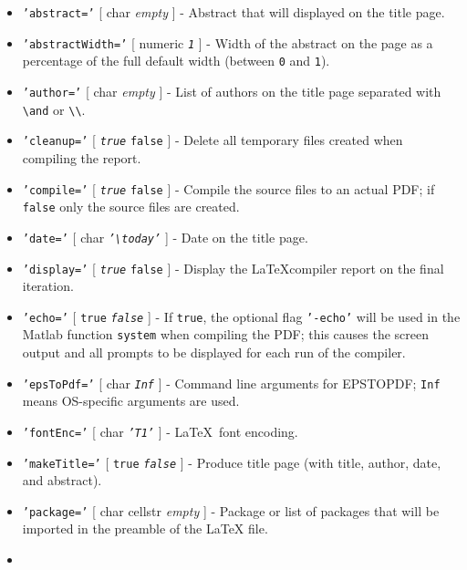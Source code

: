  \begin{itemize}
 \item
   \texttt{'abstract='} {[} char \textbar{} \emph{empty} {]} - Abstract
   that will displayed on the title page.
 \item
   \texttt{'abstractWidth='} {[} numeric \textbar{} \emph{\texttt{1}} {]}
   - Width of the abstract on the page as a percentage of the full
   default width (between \texttt{0} and \texttt{1}).
 \item
   \texttt{'author='} {[} char \textbar{} \emph{empty} {]} - List of
   authors on the title page separated with \texttt{\textbackslash{}and}
   or \texttt{\textbackslash{}\textbackslash{}}.
 \item
   \texttt{'cleanup='} {[} \emph{\texttt{true}} \textbar{} \texttt{false}
   {]} - Delete all temporary files created when compiling the report.
 \item
   \texttt{'compile='} {[} \emph{\texttt{true}} \textbar{} \texttt{false}
   {]} - Compile the source files to an actual PDF; if \texttt{false}
   only the source files are created.
 \item
   \texttt{'date='} {[} char \textbar{}
   \emph{\texttt{'\textbackslash{}today'}} {]} - Date on the title page.
 \item
   \texttt{'display='} {[} \emph{\texttt{true}} \textbar{} \texttt{false}
   {]} - Display the \LaTeX compiler report on the final iteration.
 \item
   \texttt{'echo='} {[} \texttt{true} \textbar{} \emph{\texttt{false}}
   {]} - If \texttt{true}, the optional flag \texttt{'-echo'} will be
   used in the Matlab function \texttt{system} when compiling the PDF;
   this causes the screen output and all prompts to be displayed for each
   run of the compiler.
 \item
   \texttt{'epsToPdf='} {[} char \textbar{} \emph{\texttt{Inf}} {]} -
   Command line arguments for EPSTOPDF; \texttt{Inf} means OS-specific
   arguments are used.
 \item
   \texttt{'fontEnc='} {[} char \textbar{} \emph{\texttt{'T1'}} {]} -
   \LaTeX~font encoding.
 \item
   \texttt{'makeTitle='} {[} \texttt{true} \textbar{}
   \emph{\texttt{false}} {]} - Produce title page (with title, author,
   date, and abstract).
 \item
   \texttt{'package='} {[} char \textbar{} cellstr \textbar{}
   \emph{empty} {]} - Package or list of packages that will be imported
   in the preamble of the LaTeX file.
 \item

\end{itemize}
